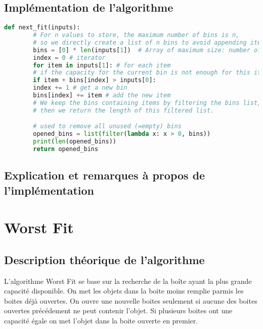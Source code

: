 \documentclass{article}
\begin{document}
    \subsection{Implémentation de l'algorithme}
    \begin{lstlisting}[language=Python, frame=single]
        def next_fit(inputs):
        # For n values to store, the maximum number of bins is n,
        # so we directly create a list of n bins to avoid appending items
        bins = [0] * len(inputs[1])  # Array of maximum size: number of items
        index = 0 # iterator
        for item in inputs[1]: # for each item
        # if the capacity for the current bin is not enough for this item
        if item + bins[index] > inputs[0]:
        index += 1 # get a new bin
        bins[index] += item # add the new item
        # We keep the bins containing items by filtering the bins list,
        # then we return the length of this filtered list.

        # used to remove all unused (=empty) bins
        opened_bins = list(filter(lambda x: x > 0, bins))
        print(len(opened_bins))
        return opened_bins
    \end{lstlisting}

    \subsection{Explication et remarques à propos de l'implémentation}

    \lipsum[1]



    \section{Worst Fit}

    \subsection{Description théorique de l'algorithme}
    L'algorithme Worst Fit se base sur la recherche de la boîte ayant la plus grande capacité disponible.
    On met les objets dans la boite moins remplie parmis les boites déjà ouvertes.
    On ouvre une nouvelle boites seulement si aucune des boites ouvertes précédement ne peut contenir l'objet.
    Si plusieurs boites ont une capacité égale on met l'objet dans la boite ouverte en premier.
\end{document}
